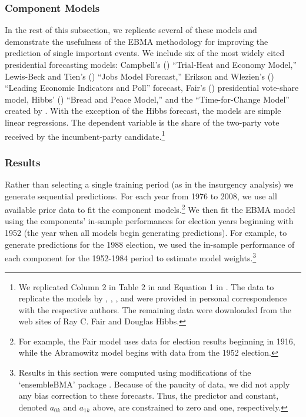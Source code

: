 \documentclass[pdftex,12pt,fullpage,oneside]{amsart}
\begin{document}
\subsubsection{Component Models}

In the rest of this subsection, we replicate several of these models
and demonstrate the usefulness of the EBMA methodology for improving
the prediction of single important events.  We include six of the most
widely cited presidential forecasting models: Campbell's
(\citeyear{Campbell:2008}) ``Trial-Heat and Economy Model,''
Lewis-Beck and Tien's (\citeyear{Lewis-Beck:Tien:2008}) ``Jobs Model
Forecast,'' Erikson and Wlezien's (\citeyear{Erikson:Wlezien:2008})
``Leading Economic Indicators and Poll'' forecast, Fair's
(\citeyear{Fair:2010}) presidential vote-share model, Hibbs'
(\citeyear{Hibbs:2000}) ``Bread and Peace Model,'' and the
``Time-for-Change Model'' created by
\citet{Abramowitz:2008}.  \noindent With the exception of the Hibbs
forecast, the models are simple linear regressions. The dependent
variable is the share of the two-party vote received by the
incumbent-party candidate.\footnote{We replicated Column 2 in Table 2
  in \citet{Erikson:Wlezien:2008} and Equation 1 in
  \citet{Fair:2010}. The data to replicate the models by
  \citet{Abramowitz:2008}, \citet{Campbell:2008},
  \citet{Erikson:Wlezien:2008}, and \citet{Lewis-Beck:Tien:2008} were
  provided in personal correspondence with the respective authors.
  The remaining data were downloaded from the web sites of Ray C. Fair
  \nocite{Fair2011} and Douglas Hibbs\nocite{Hibbs2011}.}



\subsubsection{Results}

Rather than selecting a single training period (as in the insurgency
analysis) we generate sequential predictions.  For each year from 1976
to 2008, we use all available prior data to fit the component
models.\footnote{For example, the Fair model uses data for election
  results beginning in 1916, while the Abramowitz model begins with
  data from the 1952 election. }  We then fit the EBMA model using the
components' in-sample performances for election years beginning with
1952 (the year when all models begin generating predictions).  For
example, to generate predictions for the 1988 election, we used the
in-sample performance of each component for the 1952-1984 period to
estimate model weights.\footnote{Results in this section were computed
  using modifications of the `ensembleBMA' package
  \citep{Fraley:2010b, Fraley:Forthcoming}.  Because of the paucity of
  data, we did not apply any bias correction to these forecasts.  Thus,
  the predictor and constant, denoted $a_{0k}$ and $a_{1k}$ above, are
  constrained to zero and one, respectively.}
\end{document}
